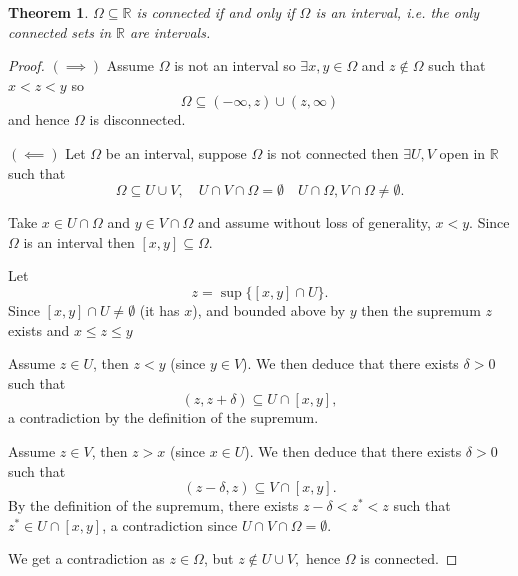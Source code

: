 \documentclass[11pt,openany]{book}
\theoremstyle{plain}
\newtheorem{theorem}{Theorem}[chapter]
\theoremstyle{definition}
\theoremstyle{remark}
\newcommand{\R}{\mathbb{R}}
\newcommand{\Om}{\Omega}
\newcommand{\set}[1]{\{ #1 \}}
\begin{document}
\begin{theorem}
    $\Om \subseteq \R$ is connected if and only if $\Om$ is an interval, i.e. the only connected sets in $\R$ are intervals.
\end{theorem}

\begin{proof}
    $(\implies)$ Assume $\Om$ is not an interval so $\exists x,y \in \Om$ and $z \notin \Om$ such that $x<z<y$ so $$\Om \subseteq (-\infty, z) \cup (z, \infty)$$ and hence $\Om$ is disconnected.

    
    $(\impliedby)$ Let $\Om$ be an interval, suppose $ \Om$ is not connected then $ \exists U,V$ open in $\R$ such that $$ \Om \subseteq U \cup V,\quad U \cap V \cap \Om = \emptyset\quad U \cap \Om, V \cap \Om \ne \emptyset.$$
    
    Take $x \in U \cap \Om$ and $ y \in V \cap \Om$ and assume without loss of generality, $x <y$. Since $\Omega$ is an interval then $[x,y] \subseteq \Om$.

    Let 
    $$z = \sup\set{[x,y] \cap U}.$$ 
    Since $[x,y] \cap U \ne \emptyset$ (it has $x$), and bounded above by $y$ then the supremum $z$ exists and $x\leq z\leq y$
    
    
    
    Assume $z\in U$, then $z<y$ (since $y\in V$). We then deduce that there exists $\delta>0$ such that $$(z,z+\delta)\subseteq U\cap [x,y],$$
    a contradiction by the definition of the supremum.
    
    Assume $z\in V$, then $z>x$ (since $x\in U$). We then deduce that there exists $\delta>0$ such that $$(z-\delta,z)\subseteq V\cap [x,y].$$
    By the definition of the supremum, there exists $z-\delta<z^*<z$ such that $z^*\in U\cap [x,y]$, a contradiction since $U\cap V\cap \Omega=\emptyset.$

    We get a contradiction as $z\in \Omega$, but $z\notin U\cup V,$ hence $\Omega$ is connected.
    
    
    
\end{proof}
\end{document}
